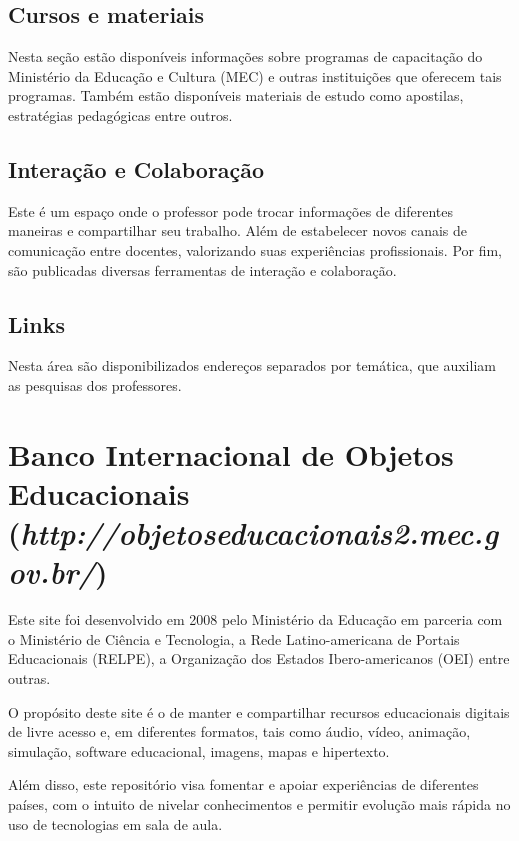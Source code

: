 \documentclass[a4paper,12pt]{report}
\begin{document}
            \subsection{Cursos e materiais}
            Nesta seção estão disponíveis informações sobre programas de
            capacitação do Ministério da Educação e Cultura (MEC) e outras
            instituições que oferecem tais programas. Também estão disponíveis
            materiais de estudo como apostilas, estratégias pedagógicas entre
            outros.

            \subsection{Interação e Colaboração}
            Este é um espaço onde o professor pode trocar informações de
            diferentes maneiras e compartilhar seu trabalho. Além de estabelecer
            novos canais de comunicação entre docentes, valorizando suas
            experiências profissionais. Por fim, são publicadas diversas
            ferramentas de interação e colaboração.

            \subsection{Links}
            Nesta área são disponibilizados endereços separados por temática,
            que auxiliam as pesquisas dos professores.

        \section{Banco Internacional de Objetos Educacionais
                \\(\emph{http://objetoseducacionais2.mec.gov.br/})}
        Este site foi desenvolvido em 2008 pelo Ministério da Educação em
        parceria com o Ministério de Ciência e Tecnologia, a Rede
        Latino-americana de Portais Educacionais (RELPE), a Organização dos
        Estados Ibero-americanos (OEI) entre outras.

        O propósito deste site é o de manter e compartilhar recursos
        educacionais digitais de livre acesso e, em diferentes formatos, tais
        como áudio, vídeo, animação, simulação, software educacional, imagens,
        mapas e hipertexto.

        Além disso, este repositório visa fomentar e apoiar experiências de
        diferentes países, com o intuito de nivelar conhecimentos e permitir
        evolução mais rápida no uso de tecnologias em sala de aula.
\end{document}
